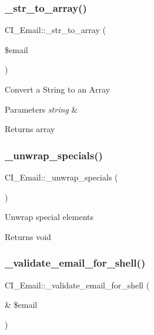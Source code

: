 \subsubsection{\texorpdfstring{\+\_\+str\+\_\+to\+\_\+array()}{\_str\_to\_array()}}
{\footnotesize\ttfamily C\+I\+\_\+\+Email\+::\+\_\+str\+\_\+to\+\_\+array (\begin{DoxyParamCaption}\item[{}]{\$email }\end{DoxyParamCaption})\hspace{0.3cm}{\ttfamily [protected]}}

Convert a String to an Array


\begin{DoxyParams}{Parameters}
{\em string} & \\
\hline
\end{DoxyParams}
\begin{DoxyReturn}{Returns}
array 
\end{DoxyReturn}
\mbox{\label{class_c_i___email_a7d890ac5ad876a27a914b40600ae4e64}} 
\subsubsection{\texorpdfstring{\+\_\+unwrap\+\_\+specials()}{\_unwrap\_specials()}}
{\footnotesize\ttfamily C\+I\+\_\+\+Email\+::\+\_\+unwrap\+\_\+specials (\begin{DoxyParamCaption}{ }\end{DoxyParamCaption})\hspace{0.3cm}{\ttfamily [protected]}}

Unwrap special elements

\begin{DoxyReturn}{Returns}
void 
\end{DoxyReturn}
\mbox{\label{class_c_i___email_aefdcdf1521a41b9914518e5e686ddbde}} 
\subsubsection{\texorpdfstring{\+\_\+validate\+\_\+email\+\_\+for\+\_\+shell()}{\_validate\_email\_for\_shell()}}
{\footnotesize\ttfamily C\+I\+\_\+\+Email\+::\+\_\+validate\+\_\+email\+\_\+for\+\_\+shell (\begin{DoxyParamCaption}\item[{\&}]{\$email }\end{DoxyParamCaption})\hspace{0.3cm}{\ttfamily [protected]}}

